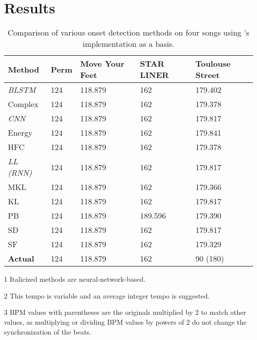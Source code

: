 \documentclass[11pt, oneside]{article}
\begin{document}
\section{Results}

\begin{table}[htbp!]
    \centering
    \begin{threeparttable}
    \begin{tabular}{lllll}
    \toprule
    \textbf{Method}\tnote{1}  & \textbf{Perm} & \textbf{Move Your Feet} & \textbf{STAR LINER} & \textbf{Toulouse Street} \\ \midrule
    \textit{BLSTM}      & 124  & 118.879           & 162      & 179.402            \\
    Complex             & 124  & 118.879           & 162      & 179.378            \\
    \textit{CNN}        & 124  & 118.879           & 162      & 179.817            \\
    Energy              & 124  & 118.879           & 162      & 179.841            \\
    HFC                 & 124  & 118.879           & 162      & 179.378            \\
    \textit{LL (RNN)}   & 124  & 118.879           & 162      & 179.817            \\
    MKL                 & 124  & 118.879           & 162      & 179.366            \\
    KL                  & 124  & 118.879           & 162      & 179.817            \\
    PB                  & 124  & 118.879           & 189.596  & 179.390            \\
    SD                  & 124  & 118.879           & 162      & 179.817            \\
    SF                  & 124  & 118.879           & 162      & 179.329            \\
    \rowcolor[HTML]{EFEFEF} 
    \textbf{Actual}     & 124  & 118.879\tnote{2}  & 162      & 90 (180)\tnote{3}  \\
    \bottomrule
    \end{tabular}
    \begin{tablenotes}
    \item[1] Italicized methods are neural-network-based.
    \item[2] This tempo is variable and an average integer tempo is suggested.
    \item[3] BPM values with parentheses are the originals multiplied by 2 to match other values, as multiplying or dividing BPM values by powers of 2 do not change the synchronization of the beats.
    \end{tablenotes}
    \end{threeparttable}
    \caption{Comparison of various onset detection methods on four songs using \citeauthor*{bram}'s implementation as a basis.}
    \label{tab:onsetmethods}
\end{table}
\end{document}
